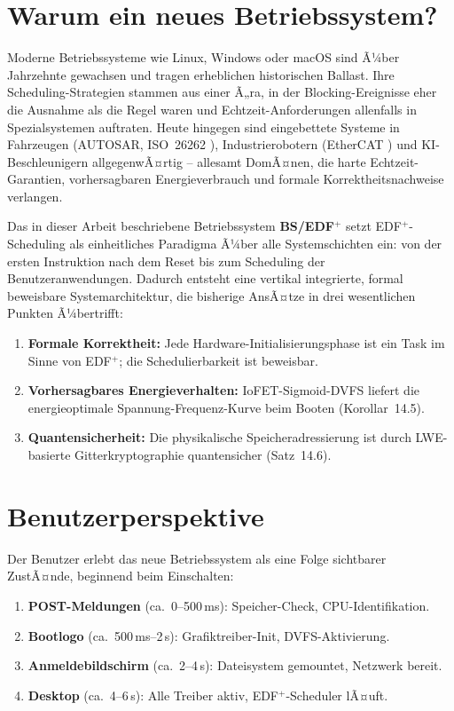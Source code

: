 ﻿\documentclass[a4paper,12pt]{scrreprt}
\theoremstyle{definition}
\begin{document}
	\section{Warum ein neues Betriebssystem?}
	
	Moderne Betriebssysteme wie Linux, Windows oder macOS sind Ã¼ber Jahrzehnte
	gewachsen und tragen erheblichen historischen Ballast. Ihre Scheduling-Strategien
	stammen aus einer Ã„ra, in der Blocking-Ereignisse eher die Ausnahme als die Regel
	waren und Echtzeit-Anforderungen allenfalls in Spezialsystemen auftraten. Heute
	hingegen sind eingebettete Systeme in Fahrzeugen (AUTOSAR, ISO~26262 \cite{ISO26262}),
	Industrierobotern (EtherCAT \cite{IEC61158}) und KI-Beschleunigern allgegenwÃ¤rtig --
	allesamt DomÃ¤nen, die harte Echtzeit-Garantien, vorhersagbaren Energieverbrauch
	und formale Korrektheitsnachweise verlangen.
	
	Das in dieser Arbeit beschriebene Betriebssystem \textbf{BS/EDF$^+$} setzt
	EDF$^+$-Scheduling \cite{Epp2026edfplus} als einheitliches Paradigma Ã¼ber alle
	Systemschichten ein: von der ersten Instruktion nach dem Reset bis zum Scheduling
	der Benutzeranwendungen. Dadurch entsteht eine vertikal integrierte,
	formal beweisbare Systemarchitektur, die bisherige AnsÃ¤tze in drei wesentlichen
	Punkten Ã¼bertrifft:
	
	\begin{enumerate}
		\item \textbf{Formale Korrektheit:} Jede Hardware-Initialisierungsphase ist
		ein Task im Sinne von EDF$^+$; die Schedulierbarkeit ist beweisbar.
		\item \textbf{Vorhersagbares Energieverhalten:} IoFET-Sigmoid-DVFS liefert
		die energieoptimale Spannung-Frequenz-Kurve beim Booten (Korollar~14.5).
		\item \textbf{Quantensicherheit:} Die physikalische Speicheradressierung
		ist durch LWE-basierte Gitterkryptographie quantensicher (Satz~14.6).
	\end{enumerate}
	
	\section{Benutzerperspektive}
	
	Der Benutzer erlebt das neue Betriebssystem als eine Folge sichtbarer
	ZustÃ¤nde, beginnend beim Einschalten:
	
	\begin{enumerate}
		\item \textbf{POST-Meldungen} (ca.\ 0--500\,ms): Speicher-Check, CPU-Identifikation.
		\item \textbf{Bootlogo} (ca.\ 500\,ms--2\,s): Grafiktreiber-Init, DVFS-Aktivierung.
		\item \textbf{Anmeldebildschirm} (ca.\ 2--4\,s): Dateisystem gemountet, Netzwerk bereit.
		\item \textbf{Desktop} (ca.\ 4--6\,s): Alle Treiber aktiv, EDF$^+$-Scheduler lÃ¤uft.
	\end{enumerate}
	
\end{document}
